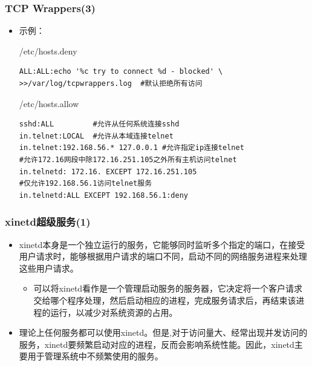 \documentclass[xcolor=svgnames,presentation]{beamer}
\begin{document}
\begin{frame}[fragile]
\frametitle{TCP Wrappers(3)}
\label{sec-7-5}
\begin{itemize}

\item 示例：
\label{sec-7-5-1}%
\begin{exampleblock}{/etc/hosts.deny}
\label{sec-7-5-1-1}


\begin{verbatim}
ALL:ALL:echo '%c try to connect %d - blocked' \
>>/var/log/tcpwrappers.log  #默认拒绝所有访问
\end{verbatim}
\end{exampleblock}
\begin{block}{/etc/hosts.allow}
\label{sec-7-5-1-2}


\begin{verbatim}
sshd:ALL         #允许从任何系统连接sshd
in.telnet:LOCAL  #允许从本域连接telnet
in.telnet:192.168.56.* 127.0.0.1 #允许指定ip连接telnet
#允许172.16网段中除172.16.251.105之外所有主机访问telnet
in.telnetd: 172.16. EXCEPT 172.16.251.105
#仅允许192.168.56.1访问telnet服务
in.telnetd:ALL EXCEPT 192.168.56.1:deny
\end{verbatim}
\end{block}
\end{itemize} %
\end{frame}
\begin{frame}
\frametitle{xinetd超级服务(1)}
\label{sec-7-6}
\begin{itemize}

\item xinetd本身是一个独立运行的服务，它能够同时监听多个指定的端口，在接受用户请求时，能够根据用户请求的端口不同，启动不同的网络服务进程来处理这些用户请求。
\label{sec-7-6-1}%
\begin{itemize}

\item 可以将xinetd看作是一个管理启动服务的服务器，它决定将一个客户请求交给哪个程序处理，然后启动相应的进程，完成服务请求后，再结束该进程的运行，以减少对系统资源的占用。
\label{sec-7-6-1-1}%
\end{itemize} %

\item 理论上任何服务都可以使用xinetd。但是,对于访问量大、经常出现并发访问的服务，xinetd要频繁启动对应的进程，反而会影响系统性能。因此，xinetd主要用于管理系统中不频繁使用的服务。
\label{sec-7-6-2}%
\end{itemize} %
\end{frame}
\end{document}
